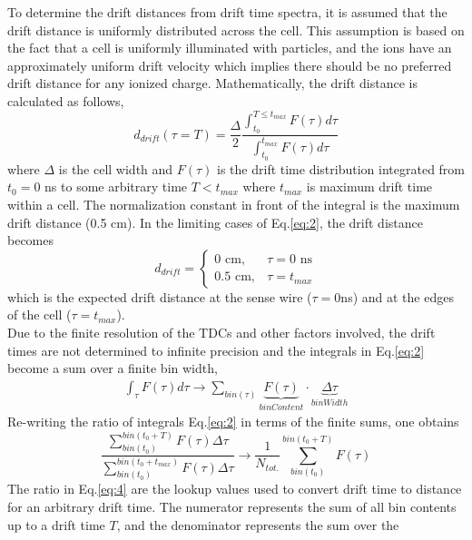 \documentclass[journal, a4paper]{IEEEtran}
\begin{document}
\indent To determine the drift distances from drift time spectra, it is assumed that the
drift distance is uniformly distributed across the cell. This assumption is based on the fact that
a cell is uniformly illuminated with particles, and the ions have an approximately uniform drift velocity
which implies there should be no preferred drift distance for any ionized charge.
Mathematically, the drift distance is calculated as follows,
\begin{equation}\label{eq:2}
d_{drift}(\tau = T) = \frac{\Delta}{2} \frac{\int_{t_{0}}^{T\leq t_{max}}F(\tau)d\tau}{\int_{t_{0}}^{t_{max}}F(\tau)d\tau}
\end{equation}
where $\Delta$ is the cell width and $F(\tau)$ is the drift time distribution integrated from $t_{0} = 0$ ns to some arbitrary time $T<t_{max}$
where $t_{max}$ is maximum drift time within a cell. The normalization constant in front of the integral is the maximum
drift distance (0.5 cm). In the limiting cases of Eq.\ref{eq:2}, the drift distance becomes
\begin{equation}
  d_{drift} =\begin{cases}
               0 \text{ cm}, & \tau = 0 \text{ ns} \\
               0.5 \text{ cm}, & \tau = t_{max}
            \end{cases}
\end{equation}
which is the expected drift distance at the sense wire ($\tau=0 $ns) and at the edges of the cell ($\tau = t_{max}$). \\
\indent Due to the finite resolution of the TDCs and other factors involved, the drift times are not determined to infinite precision and
the integrals in Eq.\ref{eq:2} become a sum over a finite bin width,
\begin{align*}
\int_{\tau}F(\tau)d\tau \longrightarrow \sum_{bin(\tau)} \underbrace{F(\tau)}_{binContent}\cdot\underbrace{\Delta\tau}_{binWidth}
\end{align*}
Re-writing the ratio of integrals Eq.\ref{eq:2} in terms of the finite sums, one obtains
\begin{equation}\label{eq:4}
\frac{\sum\limits_{bin(t_{0})}^{bin(t_{0}+T)}F(\tau)\Delta\tau}{\sum\limits_{bin(t_{0})}^{bin(t_{0}+t_{max})}F(\tau)\Delta\tau} \rightarrow \boxed{\frac{1}{N_{tot.}}\sum\limits_{bin(t_{0})}^{bin(t_{0}+T)}F(\tau)}
\end{equation}
The ratio in Eq.\ref{eq:4} are the lookup values used to convert drift time to distance for an arbitrary drift time. The
numerator represents the sum of all bin contents up to a drift time $T$, and the denominator represents the sum over the
\end{document}
